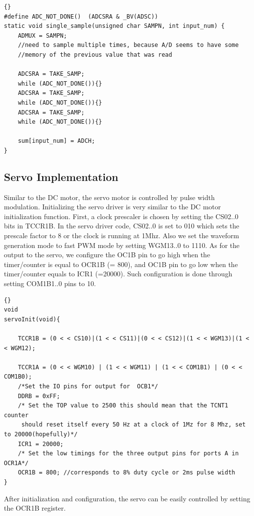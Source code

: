 \lstset{language=c}
\lstset{commentstyle=\textit}
\begin{lstlisting}[frame=trbl]{}
#define ADC_NOT_DONE() 	(ADCSRA & _BV(ADSC)) 
static void single_sample(unsigned char SAMPN, int input_num) {
	ADMUX = SAMPN;
	//need to sample multiple times, because A/D seems to have some
	//memory of the previous value that was read

	ADCSRA = TAKE_SAMP;
	while (ADC_NOT_DONE()){}
	ADCSRA = TAKE_SAMP;
	while (ADC_NOT_DONE()){}
	ADCSRA = TAKE_SAMP;
	while (ADC_NOT_DONE()){}

	sum[input_num] = ADCH;
}
\end{lstlisting}

\subsection{Servo Implementation}
Similar to the DC motor, the servo motor is controlled by pulse width modulation. Initializing the servo driver is very similar to the DC motor initialization function. First, a clock prescaler is chosen by setting the CS02..0 bits in TCCR1B. In the servo driver code, CS02..0 is set to 010 which sets the prescale factor to 8 or the clock is running at 1Mhz. Also we set the waveform generation mode to fast PWM mode by setting WGM13..0 to 1110. As for the output to the servo, we configure the OC1B pin to go high when the timer/counter is equal to OCR1B (= 800), and OC1B pin to go low when the timer/counter equals to ICR1 (=20000). Such configuration is done through setting COM1B1..0 pins to 10.

\lstset{language=c}
\lstset{commentstyle=\textit}
\begin{lstlisting}[frame=trbl]{}
void
servoInit(void){

	TCCR1B = (0 < < CS10)|(1 < < CS11)|(0 < < CS12)|(1 < < WGM13)|(1 < < WGM12);

	TCCR1A = (0 < < WGM10) | (1 < < WGM11) | (1 < < COM1B1) | (0 < < COM1B0);
	/*Set the IO pins for output for  OCB1*/
	DDRB = 0xFF;
	/* Set the TOP value to 2500 this should mean that the TCNT1 counter
	 should reset itself every 50 Hz at a clock of 1Mz for 8 Mhz, set to 20000(hopefully)*/
	ICR1 = 20000;
	/* Set the low timings for the three output pins for ports A in OCR1A*/
	OCR1B = 800; //corresponds to 8% duty cycle or 2ms pulse width
}
\end{lstlisting}

After initialization and configuration, the servo can be easily controlled by setting the OCR1B register.

